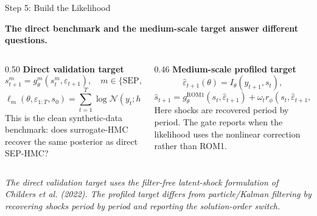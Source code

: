 \documentclass[aspectratio=169,10pt]{beamer}
\newcommand{\sep}{\mathrm{SEP}}
\newcommand{\rom}{\mathrm{ROM1}}
\newcommand{\eps}{\varepsilon}
\newcommand{\state}{s}
\newcommand{\obs}{y}
\newcommand{\sourcefoot}[1]{%
  \vspace{-0.55em}
  \begin{flushleft}
  \parbox{0.96\linewidth}{\raggedright\tiny\textit{#1}}
  \end{flushleft}
}
\newcommand{\claim}[1]{%
  \begin{center}
  \parbox{0.94\linewidth}{\centering\large\bfseries #1}
  \end{center}
}
\begin{document}
\begin{frame}{Step 5: Build the Likelihood}
\claim{The direct benchmark and the medium-scale target answer different questions.}

\vspace{0.15em}
\begin{columns}[T,onlytextwidth]
\begin{column}{0.50\textwidth}
\textbf{Direct validation target}
\[
  \state_{t+1}^{m}
  =
  g_\theta^m(\state_t^m,\eps_{t+1}),
  \quad
  m\in\{\sep,\phi\}.
\]
\[
  \ell_m(\theta,\eps_{1:T},\state_0)
  =
  \sum_{t=1}^{T}
  \log \mathcal N
  \!\left(
  \obs_t;h(\state_t^m;\theta),\Sigma_y
  \right).
\]
\scriptsize This is the clean synthetic-data benchmark: does surrogate-HMC recover the same posterior as direct SEP-HMC?
\end{column}
\begin{column}{0.46\textwidth}
\textbf{Medium-scale profiled target}
\[
  \widehat{\eps}_{t+1}(\theta)
  =
  I_\theta(\obs_{t+1},\state_t),
\]
\[
  \widehat{\state}_{t+1}
  =
  g^{\rom}_{\theta}(\state_t,\widehat{\eps}_{t+1})
  +
  \omega_t r_{\phi}(\state_t,\widehat{\eps}_{t+1},\theta).
\]
\scriptsize Here shocks are recovered period by period. The gate reports when the likelihood uses the nonlinear correction rather than ROM1.
\end{column}
\end{columns}
\sourcefoot{The direct validation target uses the filter-free latent-shock formulation of Childers et al. (2022). The profiled target differs from particle/Kalman filtering by recovering shocks period by period and reporting the solution-order switch.}
\end{frame}
\end{document}
